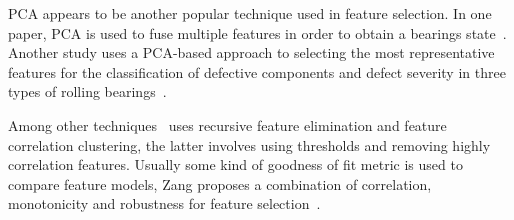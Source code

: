 \documentclass[]{article}
\begin{document}
\gls{PCA} appears to be another popular technique used in feature selection. In one paper, PCA is used to fuse multiple features in order to obtain a bearings state~\cite{lu2016degradation}. Another study uses a PCA-based approach to selecting the most representative features for the classification of defective components and defect severity in three types of rolling bearings~\cite{malhi2004pca}. 

Among other techniques~\cite{buckley2023feature} uses recursive feature elimination and feature correlation clustering, the latter involves using thresholds and removing highly correlation features. Usually some kind of goodness of fit metric is used to compare feature models, Zang proposes a combination of correlation, monotonicity and robustness for feature selection~\cite{zhang2016degradation}.

\end{document}
